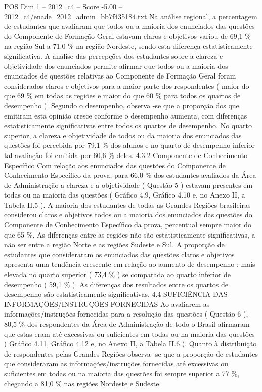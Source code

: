 \begin{textsample}{POS Dim 1 – 2012\_c4 – Score -5.00 – 2012\_c4/enade\_2012\_admin\_bb7f435184.txt}
Na análise regional, a percentagem de estudantes que avaliaram que todos ou a maioria dos enunciados das questões do Componente de Formação Geral estavam claros e objetivos variou de 69,1 \% na região Sul a 71.0 \% na região Nordeste, sendo esta diferença estatisticamente significativa.
A análise das percepções dos estudantes sobre a clareza e objetividade dos enunciados permite afirmar que todos ou a maioria dos enunciados de questões relativas ao Componente de Formação Geral foram considerados claros e objetivos para a maior parte dos respondentes ( maior do que 69 \% em todas as regiões e maior do que 60 \% para todos os quartos de desempenho ).
Segundo o desempenho, observa -se que a proporção dos que emitiram esta opinião cresce conforme o desempenho aumenta, com diferenças estatisticamente significativas entre todos os quartos de desempenho.
No quarto superior, a clareza e objetividade de todos ou da maioria dos enunciados das questões foi percebida por 79,1 \% dos alunos e no quarto de desempenho inferior tal avaliação foi emitida por 60,6 \% deles. 4.3.2 Componente de Conhecimento Específico Com relação aos enunciados das questões do Componente de Conhecimento Específico da prova, para 66,0 \% dos estudantes avaliados da Área de Administração a clareza e a objetividade ( Questão 5 ) estavam presentes em todas ou na maioria das questões ( Gráfico 4.9, Gráfico 4.10 e, no Anexo II, a Tabela II.5 ).
A maioria dos estudantes de todas as Grandes Regiões brasileiras considerou claros e objetivos todos ou a maioria dos enunciados das questões do Componente de Conhecimento Específico da prova, percentual sempre maior do que 65 \%.
As diferenças entre as regiões não são estatisticamente significativas, a não ser entre a região Norte e as regiões Sudeste e Sul.
A proporção de estudantes que consideraram os enunciados das questões claros e objetivos apresenta uma tendência crescente em relação ao aumento de desempenho : mais elevada no quarto superior ( 73,4 \% ) se comparada ao quarto inferior de desempenho ( 59,1 \% ).
As diferenças dos resultados entre os quartos de desempenho são estatisticamente significativas. 4.4 SUFICIÊNCIA DAS INFORMAÇÕES/INSTRUÇÕES FORNECIDAS Ao avaliarem as informações/instruções fornecidas para a resolução das questões ( Questão 6 ), 80,5 \% dos respondentes da Área de Administração de todo o Brasil afirmaram que estas eram até excessivas ou suficientes em todas ou na maioria das questões ( Gráfico 4.11, Gráfico 4.12 e, no Anexo II, a Tabela II.6 ).
Quanto à distribuição de respondentes pelas Grandes Regiões observa -se que a proporção de estudantes que consideraram as informações/instruções fornecidas até excessivas ou suficientes em todas ou na maioria das questões foi sempre superior a 77 \%, chegando a 81,0 \% nas regiões Nordeste e Sudeste.

\end{textsample}
